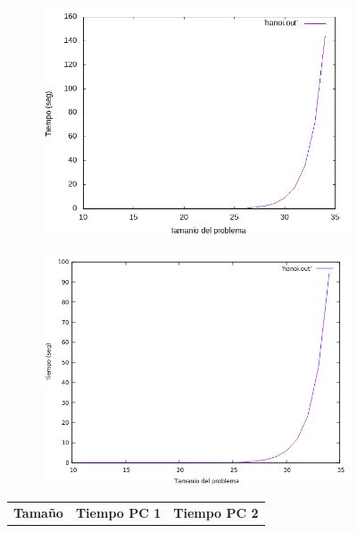 \documentclass[12pt,spanish]{article}
\begin{document}
\begin{figure}[H]
\centering
\begin{subfigure}[b]{0.45\textwidth}
\includegraphics[scale=0.45]{empirica_hanoi.png}
\caption{}
\end{subfigure}
\quad
\begin{subfigure}[b]{0.45\textwidth}
\includegraphics[scale=0.45]{empirica_hanoi_2.png}
\caption{}
\end{subfigure}
\newline
\newline
\begin{tabular}{|c|c|c|}
\hline
\textbf{Tamaño} & \textbf{Tiempo PC 1} & \textbf{Tiempo PC 2} \\

\end{tabular}
\end{figure}
\end{document}
